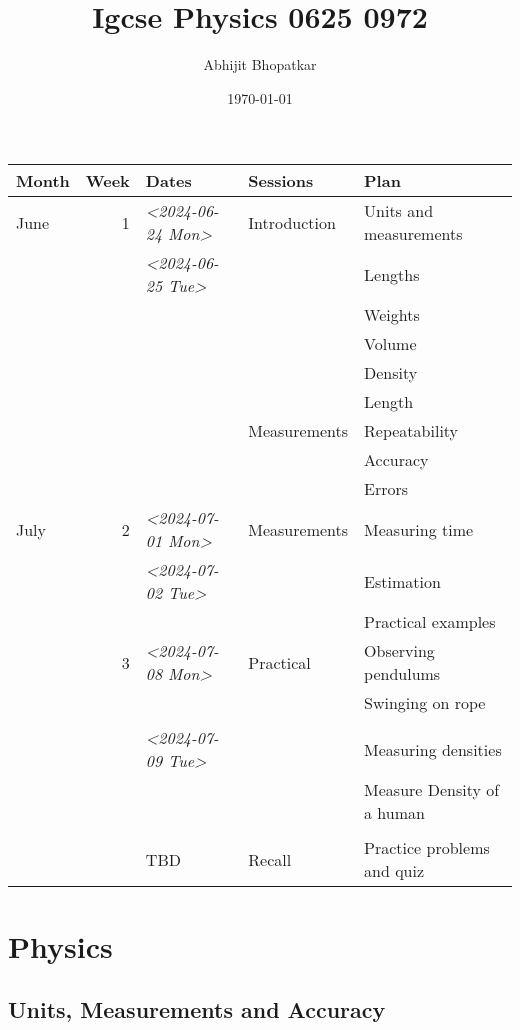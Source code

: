 \documentclass[11pt]{article}
\author{Abhijit Bhopatkar}
\date{\today}
\title{Igcse Physics 0625 0972}
\begin{document}
\maketitle
\tableofcontents

\begin{center}
\begin{tabular}{lrlll}
\hline
Month & Week & Dates & Sessions & Plan\\[0pt]
\hline
June & 1 & \textit{<2024-06-24 Mon>} & Introduction & Units and measurements\\[0pt]
 &  & \textit{<2024-06-25 Tue>} &  & Lengths\\[0pt]
 &  &  &  & Weights\\[0pt]
 &  &  &  & Volume\\[0pt]
 &  &  &  & Density\\[0pt]
 &  &  &  & Length\\[0pt]
 &  &  & Measurements & Repeatability\\[0pt]
 &  &  &  & Accuracy\\[0pt]
 &  &  &  & Errors\\[0pt]
\hline
July & 2 & \textit{<2024-07-01 Mon>} & Measurements & Measuring time\\[0pt]
 &  & \textit{<2024-07-02 Tue>} &  & Estimation\\[0pt]
 &  &  &  & Practical examples\\[0pt]
\hline
 & 3 & \textit{<2024-07-08 Mon>} & Practical & Observing pendulums\\[0pt]
 &  &  &  & Swinging on rope\\[0pt]
 &  &  &  & \\[0pt]
 &  & \textit{<2024-07-09 Tue>} &  & Measuring densities\\[0pt]
 &  &  &  & Measure Density of a human\\[0pt]
 &  &  &  & \\[0pt]
\hline
 &  & TBD & Recall & Practice problems and quiz\\[0pt]
\hline
\end{tabular}
\end{center}


\section{Physics}
\label{sec:org3f33c39}
\subsection{Units, Measurements and Accuracy}
\label{sec:org0157fa3}
\end{document}
